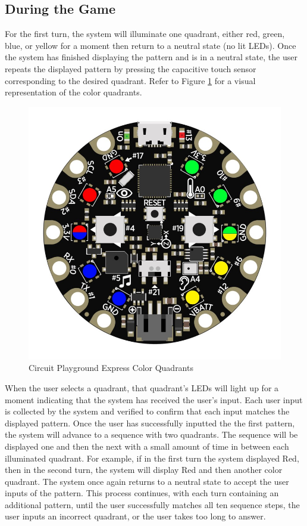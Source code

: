 \documentclass[12pt]{article}
\begin{document}
\subsection{During the Game}
For the first turn, the system will illuminate one quadrant, either red, green, blue, or yellow for a moment then return to a neutral state (no lit LEDs). Once the system has finished displaying the pattern and is in a neutral state, the user repeats the displayed pattern by pressing the capacitive touch sensor corresponding to the desired quadrant. Refer to Figure \ref{fig:CPE_Lit_LEDs} for a visual representation of the color quadrants. 

\begin{figure}[!t]
\centering
\includegraphics[width=4.5in]{Lit_LEDS.jpg}
\caption{Circuit Playground Express Color Quadrants \cite{Adafruitwebsite}}
\label{fig:CPE_Lit_LEDs}
\end{figure}

When the user selects a quadrant, that quadrant's LEDs will light up for a moment indicating that the system has received the user's input. Each user input is collected by the system and verified to confirm that each input matches the displayed pattern. Once the user has successfully inputted the the first pattern, the system will advance to a sequence with two quadrants. The sequence will be displayed one and then the next with a small amount of time in between each illuminated quadrant. For example, if in the first turn the system displayed Red, then in the second turn, the system will display Red and then another color quadrant. The system once again returns to a neutral state to accept the user inputs of the pattern. This process continues, with each turn containing an additional pattern, until the user successfully matches all ten sequence steps, the user inputs an incorrect quadrant, or the user takes too long to answer.
\end{document}
